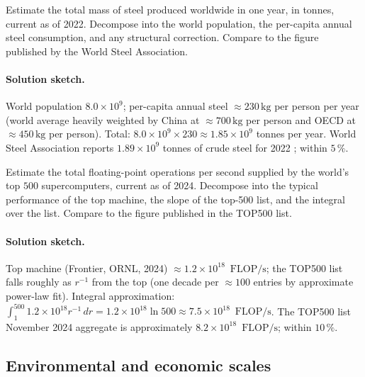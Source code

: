 \begin{exercise}
Estimate the total mass of steel produced worldwide in one year, in
tonnes, current as of 2022. Decompose into the world population,
the per-capita annual steel consumption, and any structural
correction. Compare to the figure published by the World Steel
Association.
\end{exercise}

\paragraph{Solution sketch.}
World population $8.0 \times 10^{9}$; per-capita annual steel
$\approx 230 \,\si{\kilo\gram}$ per person per year (world average
heavily weighted by China at $\approx 700 \,\si{\kilo\gram}$ per
person and OECD at $\approx 450 \,\si{\kilo\gram}$ per person).
Total: $8.0 \times 10^{9} \times 230 \approx 1.85 \times 10^{9}$
tonnes per year. World Steel Association reports $1.89 \times
10^{9}$ tonnes of crude steel for 2022 \cite{data:ch09-worldsteel-2023};
within $5\,\%$.

\begin{exercise}
Estimate the total floating-point operations per second supplied by
the world's top $500$ supercomputers, current as of 2024. Decompose
into the typical performance of the top machine, the slope of the
top-500 list, and the integral over the list. Compare to the figure
published in the TOP500 list.
\end{exercise}

\paragraph{Solution sketch.}
Top machine (Frontier, ORNL, 2024) $\approx 1.2 \times 10^{18}$
$\,\text{FLOP/s}$; the TOP500 list falls roughly as $r^{-1}$ from
the top (one decade per $\approx 100$ entries by approximate
power-law fit). Integral approximation: $\int_{1}^{500}
1.2 \times 10^{18} r^{-1} \,dr = 1.2 \times 10^{18} \ln 500
\approx 7.5 \times 10^{18}$ $\,\text{FLOP/s}$. The TOP500 list
November 2024 aggregate is approximately $8.2 \times 10^{18}$
$\,\text{FLOP/s}$; within $10\,\%$.

\subsection*{Environmental and economic scales}

